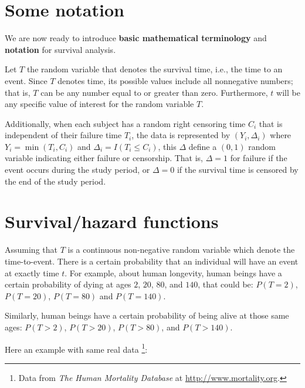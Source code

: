 \documentclass[]{book}
\let\rmarkdownfootnote\footnote%
\def\footnote{\protect\rmarkdownfootnote}
\theoremstyle{definition}
\theoremstyle{definition}
\theoremstyle{definition}
\theoremstyle{remark}
\begin{document}
\section{Some notation}\label{intro-notation}

We are now ready to introduce \textbf{basic mathematical terminology}
and \textbf{notation} for survival analysis.

Let \(T\) the random variable that denotes the survival time, i.e., the
time to an event. Since \(T\) denotes time, its possible values include
all nonnegative numbers; that is, \(T\) can be any number equal to or
greater than zero. Furthermore, \(t\) will be any specific value of
interest for the random variable \(T\).

Additionally, when each subject has a random right censoring time
\(C_i\) that is independent of their failure time \(T_i\), the data is
represented by \((Y_i, \Delta_i)\) where \(Y_i = \min(T_i, C_i)\) and
\(\Delta_i = I(T_i \le C_i)\), this \(\Delta\) define a \((0,1)\) random
variable indicating either failure or censorship. That is,
\(\Delta = 1\) for failure if the event occurs during the study period,
or \(\Delta = 0\) if the survival time is censored by the end of the
study period.

\section{Survival/hazard functions}\label{intro-functions}

Assuming that \(T\) is a continuous non-negative random variable which
denote the time-to-event. There is a certain probability that an
individual will have an event at exactly time \(t\). For example, about
human longevity, human beings have a certain probability of dying at
ages \(2\), \(20\), \(80\), and \(140\), that could be: \(P(T=2)\),
\(P(T=20)\), \(P(T=80)\) and \(P(T=140)\).

Similarly, human beings have a certain probability of being alive at
those same ages: \(P(T>2)\), \(P(T>20)\), \(P(T>80)\), and \(P(T>140)\).

Here an example with same real data \footnote{Data from \emph{The Human
  Mortality Database} at \url{http://www.mortality.org}.}:
\end{document}
